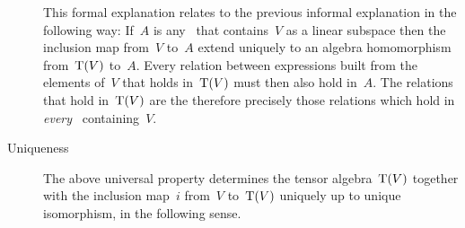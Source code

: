 \begin{recall}
\begin{description}
\begin{description*}
          This formal explanation relates to the previous informal explanation in the following way:
          If~$A$ is any~{\algebra{$\kf$}} that contains~$V$ as a linear subspace then the inclusion map from~$V$ to~$A$ extend uniquely to an algebra homomorphism from~$\operatorname{T}(V)$ to~$A$.
          Every relation between expressions built from the elements of~$V$ that holds in~$\operatorname{T}(V)$ must then also hold in~$A$.
          The relations that hold in~$\operatorname{T}(V)$ are the therefore precisely those relations which hold in \emph{every}~{\algebra{$\kf$}} containing~$V$.
      \end{description*}
      
    \item[Uniqueness]
      The above universal property determines the tensor algebra~$\operatorname{T}(V)$ together with the inclusion map~$i$ from~$V$ to~$\operatorname{T}(V)$ uniquely up to unique isomorphism, in the following sense.


\end{description}
\end{recall}
